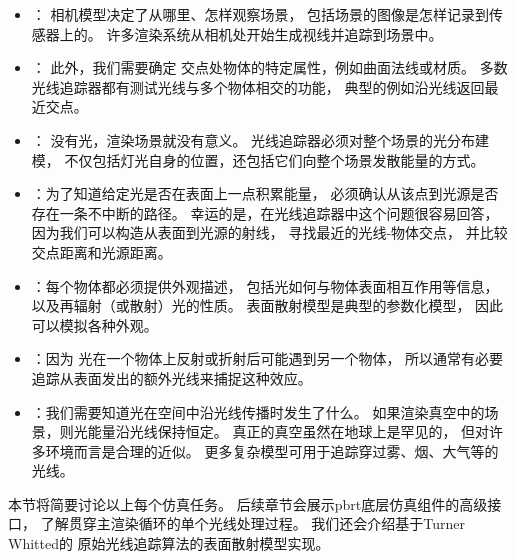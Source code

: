 \begin{itemize}
      \item {}： 相机模型决定了从哪里、怎样观察场景，
            包括场景的图像是怎样记录到传感器上的。
            许多渲染系统从相机处开始生成视线并追踪到场景中。
      \item {}： 此外，我们需要确定
            交点处物体的特定属性，例如曲面法线或材质。
            多数光线追踪器都有测试光线与多个物体相交的功能，
            典型的例如沿光线返回最近交点。
      \item {}： 没有光，渲染场景就没有意义。
            光线追踪器必须对整个场景的光分布建模，
            不仅包括灯光自身的位置，还包括它们向整个场景发散能量的方式。
      \item {}：为了知道给定光是否在表面上一点积累能量，
            必须确认从该点到光源是否存在一条不中断的路径。
            幸运的是，在光线追踪器中这个问题很容易回答，
            因为我们可以构造从表面到光源的射线，
            寻找最近的光线-物体交点，
            并比较交点距离和光源距离。
      \item {}：每个物体都必须提供外观描述，
            包括光如何与物体表面相互作用等信息，
            以及再辐射（或散射）光的性质。
            表面散射模型是典型的参数化模型，
            因此可以模拟各种外观。
      \item {}：因为
            光在一个物体上反射或折射后可能遇到另一个物体，
            所以通常有必要追踪从表面发出的额外光线来捕捉这种效应。
      \item {}：我们需要知道光在空间中沿光线传播时发生了什么。
            如果渲染真空中的场景，则光能量沿光线保持恒定。
            真正的真空虽然在地球上是罕见的，
            但对许多环境而言是合理的近似。
            更多复杂模型可用于追踪穿过雾、烟、大气等的光线。
\end{itemize}

本节将简要讨论以上每个仿真任务。
后续章节会展示pbrt底层仿真组件的高级接口，
了解贯穿主渲染循环的单个光线处理过程。
我们还会介绍基于Turner Whitted的
原始光线追踪算法的表面散射模型实现。

